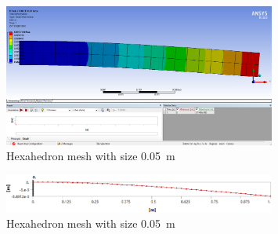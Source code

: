 \documentclass[11pt]{article}
\numberwithin{equation}{section}
\begin{document}
\begin{figure}[H]
  \centering
  \includegraphics[width = 0.8\textwidth]{./img/Q3iiiDeformation.png}
  \caption{Hexahedron mesh with size \SI{0.05}{\metre}}
\end{figure}
\begin{figure}[H]
  \centering
  \includegraphics[width = 0.8\textwidth]{./img/Q3iiiDeflection.png}
  \caption{Hexahedron mesh with size \SI{0.05}{\metre}}
\end{figure}
\end{document}
